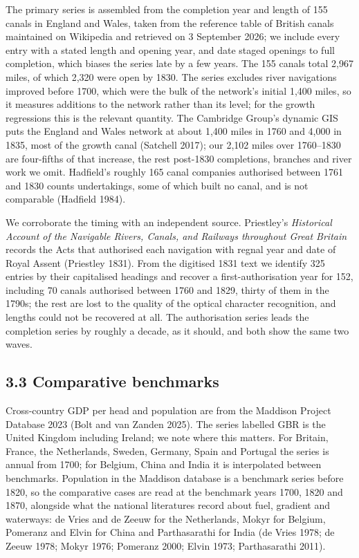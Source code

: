 \documentclass[
  11pt,
]{article}
\begin{document}
The primary series is assembled from the completion year and length of
155 canals in England and Wales, taken from the reference table of
British canals maintained on Wikipedia and retrieved on 3 September
2026; we include every entry with a stated length and opening year, and
date staged openings to full completion, which biases the series late by
a few years. The 155 canals total 2,967 miles, of which 2,320 were open
by 1830. The series excludes river navigations improved before 1700,
which were the bulk of the network's initial 1,400 miles, so it measures
additions to the network rather than its level; for the growth
regressions this is the relevant quantity. The Cambridge Group's dynamic
GIS puts the England and Wales network at about 1,400 miles in 1760 and
4,000 in 1835, most of the growth canal (Satchell 2017); our 2,102 miles
over 1760--1830 are four-fifths of that increase, the rest post-1830
completions, branches and river work we omit. Hadfield's roughly 165
canal companies authorised between 1761 and 1830 counts undertakings,
some of which built no canal, and is not comparable (Hadfield 1984).

We corroborate the timing with an independent source. Priestley's
\emph{Historical Account of the Navigable Rivers, Canals, and Railways
throughout Great Britain} records the Acts that authorised each
navigation with regnal year and date of Royal Assent (Priestley 1831).
From the digitised 1831 text we identify 325 entries by their
capitalised headings and recover a first-authorisation year for 152,
including 70 canals authorised between 1760 and 1829, thirty of them in
the 1790s; the rest are lost to the quality of the optical character
recognition, and lengths could not be recovered at all. The
authorisation series leads the completion series by roughly a decade, as
it should, and both show the same two waves.

\subsection{3.3 Comparative benchmarks}\label{comparative-benchmarks}

Cross-country GDP per head and population are from the Maddison Project
Database 2023 (Bolt and van Zanden 2025). The series labelled GBR is the
United Kingdom including Ireland; we note where this matters. For
Britain, France, the Netherlands, Sweden, Germany, Spain and Portugal
the series is annual from 1700; for Belgium, China and India it is
interpolated between benchmarks. Population in the Maddison database is
a benchmark series before 1820, so the comparative cases are read at the
benchmark years 1700, 1820 and 1870, alongside what the national
literatures record about fuel, gradient and waterways: de Vries and de
Zeeuw for the Netherlands, Mokyr for Belgium, Pomeranz and Elvin for
China and Parthasarathi for India (de Vries 1978; de Zeeuw 1978; Mokyr
1976; Pomeranz 2000; Elvin 1973; Parthasarathi 2011).
\end{document}
